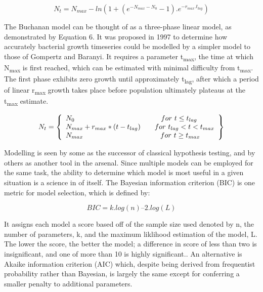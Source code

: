 \documentclass[11pt]{article}
\begin{document}
\begin{equation}
    N_{t} = N_{max} - ln{(1 + (e^{-N_{max} - N_{0}} - 1) . e^{-r_{max} . t_{lag}})}
\end{equation}
\vspace{3mm}



The Buchanan model can be thought of as a three-phase linear model, as demonstrated by Equation 6.\parencite{Buchanan1997} It was proposed in 1997 to determine how accurately bacterial growth timeseries could be modelled by a simpler model to those of Gompertz and Baranyi. It requires a parameter t\textsubscript{max}, the time at which N\textsubscript{max} is first reached, which can be estimated with minimal difficulty from t\textsubscript{max}. The first phase exhibits zero growth until approximately t\textsubscript{lag}, after which a period of linear r\textsubscript{max} growth takes place before population ultimately plateaus at the t\textsubscript{max} estimate.\parencite{Buchanan1997}

\begin{equation}
    N_{t} = \left\{
    \begin{array}{l}
        N_{0}                   \hspace{43mm}    for \           t \le t_{lag}\\
        N_{max} + r_{max} * (t - t_{lag}) \qquad for \ t_{lag} < t  <  t_{max}\\
        N_{max}                 \hspace{38.5mm}  for \           t \ge t_{max}\\
    \end{array}\right\}
\end{equation}
\vspace{5mm}



Modelling is seen by some as the successor of classical hypothesis testing, and by others as another tool in the arsenal.\parencite{Johnson2004} Since multiple models can be employed for the same task, the ability to determine which model is most useful in a given situation is a science in of itself. The Bayesian information criterion (BIC) is one metric for model selection, which is defined by:


\begin{equation}
    BIC = k.log(n) – 2.log(L)
\end{equation}
\vspace{2mm}

\noindent
It assigns each model a score based off of the sample size used denoted by n, the number of parameters, k, and the maximum liklihood estimation of the model, L.\parencite{Akaike1974} The lower the score, the better the model; a difference in score of less than two is insignificant, and one of more than 10 is highly significant.\parencite{Vrieze2012,Posada2004}. An alternative is Akaike information criterion (AIC) which, despite being derived from frequentist probability rather than Bayesian, is largely the same except for conferring a smaller penalty to additional parameters.\parencite{Posada2004}
\end{document}

